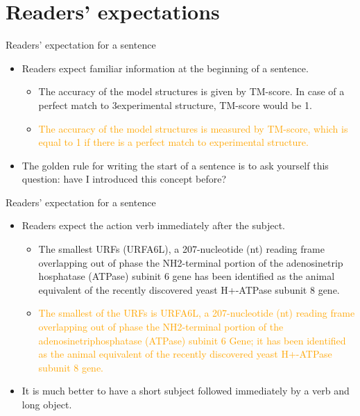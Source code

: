 \documentclass[
 size=14pt,
 paper=smartboard,  %
 mode=present, 		%
 display=slides, 	%
 style=tuliplab,  	%
 pauseslide,
 fleqn,leqno]{powerdot}{}
\begin{document}

\section{Readers' expectations}


\begin{slide}[toc=,bm=]{Readers' expectation for a sentence}
	\begin{itemize}
		\item Readers expect familiar information at the beginning of a sentence.
			\begin{itemize}
				\item \textcolor{mygreen!50}{The accuracy of the model structures is given by TM-score. In case of a perfect match to 3experimental structure, TM-score would be 1.}
				\item \textcolor{orange}{The accuracy of the model structures is measured by TM-score, which is equal to 1 if there is a perfect match to experimental structure.}
			\end{itemize}
		\item The golden rule for writing the start of a sentence is to ask yourself this question: have I introduced this concept before?	
	\end{itemize}
\end{slide}


\begin{slide}[toc=,bm=]{Readers' expectation for a sentence}
	\begin{itemize}
		\item Readers expect the action verb immediately after the subject.
			\begin{itemize}
				\item \textcolor{mygreen!50}{The smallest URFs (URFA6L), a 207-nucleotide (nt) reading frame overlapping out of phase the NH2-terminal portion of the adenosinetrip hosphatase (ATPase) subinit 6 gene has been identified as the animal equivalent of the recently discovered yeast H+-ATPase subunit 8 gene.}
				\item \textcolor{orange}{The smallest of the URFs is URFA6L, a 207-nucleotide (nt) reading frame overlapping out of phase the NH2-terminal portion of the adenosinetriphosphatase (ATPase) subinit 6 Gene; it has been identified as the animal equivalent of the recently discovered yeast H+-ATPase subunit 8 gene.}
			\end{itemize}
		\item It is much better to have a short subject followed immediately by a verb and long object.	
	\end{itemize}
\end{slide}
\end{document}
